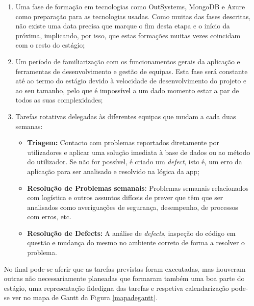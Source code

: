         \begin{enumerate}
          \item Uma fase de formação em tecnologias como OutSystems, MongoDB e Azure como preparação para as tecnologias usadas. Como muitas das fases descritas, não existe uma data precisa que marque o fim desta etapa e o início da próxima, implicando, por isso, que estas formações muitas vezes coincidam com o resto do estágio;
          \item Um período de familiarização com os funcionamentos gerais da aplicação e ferramentas de desenvolvimento e gestão de equipas. Esta fase será constante até ao termo do estágio devido à velocidade de desenvolvimento do projeto e ao seu tamanho, pelo que é impossível a um dado momento estar a par de todos as suas complexidades;
          \item Tarefas rotativas delegadas às diferentes equipas que mudam a cada duas semanas:
            \begin{itemize}
                \item \textbf{Triagem:} Contacto com problemas reportados diretamente por utilizadores e aplicar uma solução imediata à base de dados ou ao método do utilizador. Se não for possível, é criado um \textit{defect}, isto é, um erro da aplicação para ser analisado e resolvido na lógica da app;
                \item \textbf{Resolução de Problemas semanais:} Problemas semanais relacionados com logística e outros assuntos difíceis de prever que têm que ser analisados como averiguações de segurança, desempenho, de processos com erros, etc.
                \item \textbf{Resolução de Defects:} A análise de \textit{defects}, inspeção do código em questão e mudança do mesmo no ambiente correto de forma a resolver o problema. %
                
            \end{itemize}

        \end{enumerate}
    
        No final pode-se aferir que as tarefas previstas foram executadas, mas houveram outras não necessariamente planeadas que formaram também uma boa parte do estágio, uma representação fidedigna das tarefas e respetiva calendarização pode-se ver no mapa de Gantt da Figura \ref{mapadegantt}.

